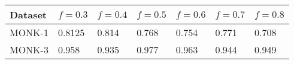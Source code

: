 \documentclass[a4paper]{article}
\begin{document}
\begin{tabularx}{\textwidth}{ |X|X|X|X|X|X|X| }
  \hline
  Dataset & $f = 0.3$ & $f = 0.4$ & $f = 0.5$ & $f = 0.6$ & $f = 0.7$ & $f = 0.8$ \\
  \hline 
  MONK-1  & 0.8125  & 0.814  & 0.768 & 0.754  & 0.771  & 0.708  \\
  \hline
  MONK-3  & 0.958 & 0.935 & 0.977 & 0.963 & 0.944 & 0.949  \\
  \hline
\end{tabularx}\\
\end{document}
